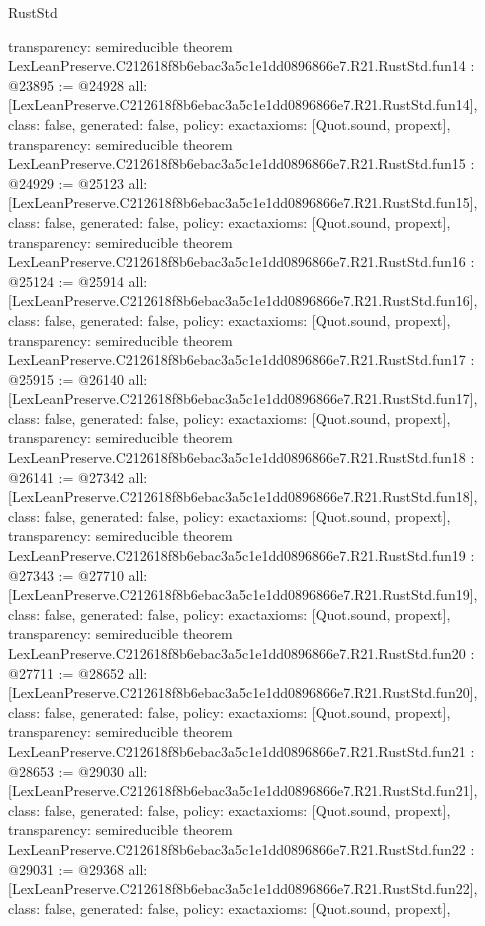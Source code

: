 \begin{lexlean}{RustStd}
\begin{coremodule}
{  transparency: semireducible
}
theorem LexLeanPreserve.C212618f8b6ebac3a5c1e1dd0896866e7.R21.RustStd.fun14 : @23895 := @24928 {
  all: [LexLeanPreserve.C212618f8b6ebac3a5c1e1dd0896866e7.R21.RustStd.fun14],
  class: false,
  generated: false,
  policy: exact{axioms: [Quot.sound, propext]},
  transparency: semireducible
}
theorem LexLeanPreserve.C212618f8b6ebac3a5c1e1dd0896866e7.R21.RustStd.fun15 : @24929 := @25123 {
  all: [LexLeanPreserve.C212618f8b6ebac3a5c1e1dd0896866e7.R21.RustStd.fun15],
  class: false,
  generated: false,
  policy: exact{axioms: [Quot.sound, propext]},
  transparency: semireducible
}
theorem LexLeanPreserve.C212618f8b6ebac3a5c1e1dd0896866e7.R21.RustStd.fun16 : @25124 := @25914 {
  all: [LexLeanPreserve.C212618f8b6ebac3a5c1e1dd0896866e7.R21.RustStd.fun16],
  class: false,
  generated: false,
  policy: exact{axioms: [Quot.sound, propext]},
  transparency: semireducible
}
theorem LexLeanPreserve.C212618f8b6ebac3a5c1e1dd0896866e7.R21.RustStd.fun17 : @25915 := @26140 {
  all: [LexLeanPreserve.C212618f8b6ebac3a5c1e1dd0896866e7.R21.RustStd.fun17],
  class: false,
  generated: false,
  policy: exact{axioms: [Quot.sound, propext]},
  transparency: semireducible
}
theorem LexLeanPreserve.C212618f8b6ebac3a5c1e1dd0896866e7.R21.RustStd.fun18 : @26141 := @27342 {
  all: [LexLeanPreserve.C212618f8b6ebac3a5c1e1dd0896866e7.R21.RustStd.fun18],
  class: false,
  generated: false,
  policy: exact{axioms: [Quot.sound, propext]},
  transparency: semireducible
}
theorem LexLeanPreserve.C212618f8b6ebac3a5c1e1dd0896866e7.R21.RustStd.fun19 : @27343 := @27710 {
  all: [LexLeanPreserve.C212618f8b6ebac3a5c1e1dd0896866e7.R21.RustStd.fun19],
  class: false,
  generated: false,
  policy: exact{axioms: [Quot.sound, propext]},
  transparency: semireducible
}
theorem LexLeanPreserve.C212618f8b6ebac3a5c1e1dd0896866e7.R21.RustStd.fun20 : @27711 := @28652 {
  all: [LexLeanPreserve.C212618f8b6ebac3a5c1e1dd0896866e7.R21.RustStd.fun20],
  class: false,
  generated: false,
  policy: exact{axioms: [Quot.sound, propext]},
  transparency: semireducible
}
theorem LexLeanPreserve.C212618f8b6ebac3a5c1e1dd0896866e7.R21.RustStd.fun21 : @28653 := @29030 {
  all: [LexLeanPreserve.C212618f8b6ebac3a5c1e1dd0896866e7.R21.RustStd.fun21],
  class: false,
  generated: false,
  policy: exact{axioms: [Quot.sound, propext]},
  transparency: semireducible
}
theorem LexLeanPreserve.C212618f8b6ebac3a5c1e1dd0896866e7.R21.RustStd.fun22 : @29031 := @29368 {
  all: [LexLeanPreserve.C212618f8b6ebac3a5c1e1dd0896866e7.R21.RustStd.fun22],
  class: false,
  generated: false,
  policy: exact{axioms: [Quot.sound, propext]},
}
\end{coremodule}
\end{lexlean}
